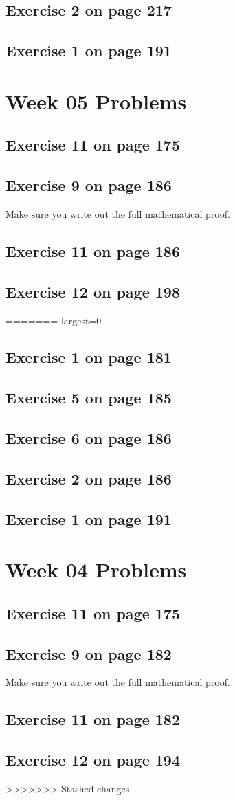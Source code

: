 \documentclass[12pt]{amsart}
\begin{document}
\subsection{Exercise 2 on page 217}
\subsection{ Exercise 1 on page 191} 


\section{Week 05 Problems}
\subsection{Exercise 11 on page 175} 
\subsection{Exercise 9 on page 186} Make sure you write out the full mathematical proof.
\subsection{Exercise 11 on page 186}
\subsection{Exercise 12 on page 198}
=======
largest=0
\subsection{Exercise 1 on page 181} 
\subsection{Exercise 5 on page 185} 
\subsection{Exercise 6 on page 186} 
\subsection{Exercise 2 on page 186}
\subsection{ Exercise 1 on page 191} 


\section{Week 04 Problems}
\subsection{Exercise 11 on page 175} 
\subsection{Exercise 9 on page 182} Make sure you write out the full mathematical proof.
\subsection{Exercise 11 on page 182}
\subsection{Exercise 12 on page 194}
>>>>>>> Stashed changes
\end{document}
